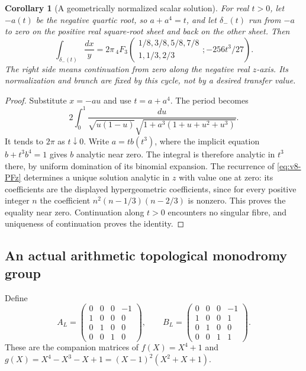 \documentclass[11pt]{article}
\newtheorem{corollary}[corollary]{Corollary}
\theoremstyle{definition}
\theoremstyle{remark}
\begin{document}
\begin{corollary}[A geometrically normalized scalar solution]
\label{cor:v8-real-period}
For real $t>0$, let $-a(t)$ be the negative quartic root, so
$a+a^4=t$, and let $\delta_-(t)$ run from $-a$ to zero on the positive
real square-root sheet and back on the other sheet. Then
\begin{equation}
 \boxed{\int_{\delta_-(t)}\frac{dx}{y}
 =2\pi\,{}_4F_3\!\left(
 \begin{matrix}1/8,3/8,5/8,7/8\\1,1/3,2/3\end{matrix};
 -256t^3/27\right).}
 \label{eq:v8-real-hypergeom}
\end{equation}
The right side means continuation from zero along the negative real $z$-axis.
Its normalization and branch are fixed by this cycle, not by a desired
transfer value.
\end{corollary}
\begin{proof}
Substitute $x=-au$ and use $t=a+a^4$. The period becomes
\[
 2\int_0^1\frac{du}
 {\sqrt{u(1-u)}\sqrt{1+a^3(1+u+u^2+u^3)}}.
\]
It tends to $2\pi$ as $t\downarrow0$. Write $a=t b(t^3)$, where the
implicit equation $b+t^3b^4=1$ gives $b$ analytic near zero. The integral
is therefore analytic in $t^3$ there, by uniform domination of its
binomial expansion. The recurrence of \eqref{eq:v8-PFz} determines a
unique solution analytic in $z$ with value one at zero: its coefficients
are the displayed hypergeometric coefficients, since for every positive
integer $n$ the coefficient $n^2(n-1/3)(n-2/3)$ is nonzero.
This proves the equality near zero. Continuation along $t>0$ encounters
no singular fibre, and uniqueness of continuation proves the identity.
\end{proof}

\subsection{An actual arithmetic topological monodromy group}
Define
\begin{equation}
 A_L=\begin{pmatrix}0&0&0&-1\\1&0&0&0\\0&1&0&0\\0&0&1&0\end{pmatrix},
 \qquad
 B_L=\begin{pmatrix}0&0&0&-1\\1&0&0&1\\0&1&0&0\\0&0&1&1\end{pmatrix}.
 \label{eq:v8-Levelt}
\end{equation}
These are the companion matrices of
$f(X)=X^4+1$ and $g(X)=X^4-X^3-X+1=(X-1)^2(X^2+X+1)$.
\end{document}
